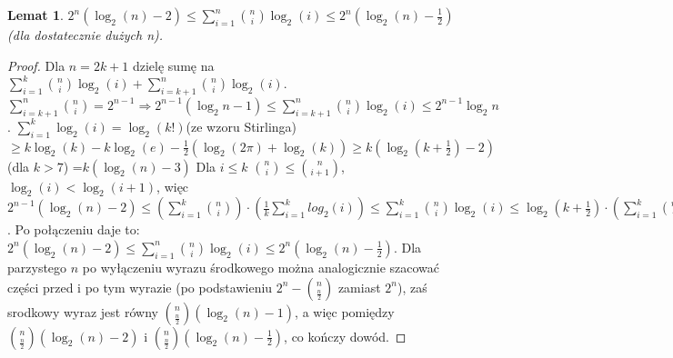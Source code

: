 \documentclass{pracamgr}
\newtheorem{lemma}[theorem]{Lemat}
\begin{document}
   \begin{lemma}\label{sum of log}
    $2^n(\log_2(n)-2)\le\sum_{i=1}^{n}{n\choose i}\log_2(i)\le 2^n(\log_2(n)-\frac{1}{2})$ (dla dostatecznie dużych n).
   \end{lemma}    
   \begin{proof}
    Dla $n=2k+1$ dzielę sumę na $\sum_{i=1}^{k}{n\choose i}\log_2(i)+\sum_{i=k+1}^{n}{n\choose i}\log_2(i)$.\newline
    $\sum_{i=k+1}^{n}{n\choose i}=2^{n-1}\Rightarrow 2^{n-1}(\log_2{n}-1)\le\sum_{i=k+1}^{n}{n\choose i}\log_2(i)\le2^{n-1}\log_2{n}$.\newline
    $\sum_{i=1}^{k}\log_2(i)=\log_2(k!)$(ze wzoru Stirlinga) $\ge k\log_2(k)-k\log_2(e)-\frac{1}{2}(\log_2(2\pi)+\log_2(k))
    \ge k(\log_2(k+\frac{1}{2})-2)$ (dla $k>7$) =$k(\log_2(n)-3)$\newline
    Dla $i\le k$ ${n\choose i}\le{n\choose i+1}$, $\log_2(i)<\log_2(i+1)$, więc
    $2^{n-1}(\log_2(n)-2)\le(\sum_{i=1}^{k}{n\choose i})\cdot(\frac{1}{k}\sum_{i=1}^{k}log_2(i))\le\sum_{i=1}^{k}{n\choose i}\log_2(i)
    \le\log_2(k+\frac{1}{2})\cdot(\sum_{i=1}^{k}{n\choose i})=2^{n-1}(\log_2(n)-1)$. Po połączeniu daje to:\newline
    $2^n(\log_2(n)-2)\le\sum_{i=1}^{n}{n\choose i}\log_2(i)\le2^n(\log_2(n)-\frac{1}{2})$.\newline
    Dla parzystego $n$ po wyłączeniu wyrazu środkowego można analogicznie szacować części przed i po tym wyrazie
    (po podstawieniu $2^n-{n\choose \frac{n}{2}}$ zamiast $2^n$), zaś srodkowy wyraz jest równy ${n\choose \frac{n}{2}}(\log_2(n)-1)$, a więc pomiędzy
    ${n\choose \frac{n}{2}}(\log_2(n)-2)$ i ${n\choose \frac{n}{2}}(\log_2(n)-\frac{1}{2})$, co kończy dowód.
   \end{proof}
\end{document}
